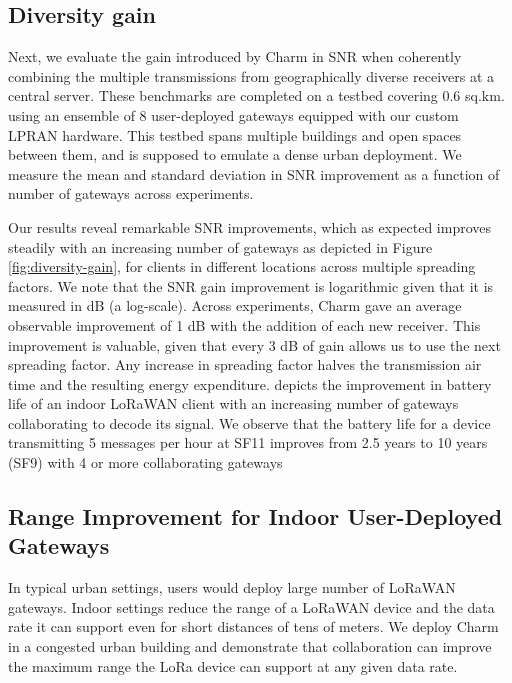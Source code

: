 \subsection{Diversity gain}
\label{sec:diversity-gain-eval}

Next, we evaluate the  gain introduced by Charm in SNR when coherently
combining the multiple transmissions from geographically diverse receivers at
a central server. These benchmarks are completed on a testbed covering 0.6
sq.km. using an ensemble of 8 user-deployed gateways equipped with our custom
LPRAN hardware. This testbed spans multiple buildings and open spaces between
them, and is supposed to emulate a dense urban deployment. We measure the mean
and standard deviation in SNR improvement as a function of number of gateways
across experiments.

Our results reveal remarkable SNR improvements, which as expected improves
steadily with an increasing number of gateways as depicted in Figure
\ref{fig:diversity-gain}, for clients in different locations across multiple
spreading factors. We note that the SNR gain improvement is logarithmic given
that it is measured in dB (a log-scale). Across experiments, Charm gave an
average observable improvement of 1 dB with the addition of each new receiver.
This improvement is valuable, given that every 3 dB of gain allows us to use
the next spreading factor. Any increase in spreading factor halves the
transmission air time and the resulting energy expenditure.
 depicts the improvement in battery life of an
indoor LoRaWAN client with an increasing number of gateways collaborating to
decode its signal. We observe that the battery life for a device transmitting
5 messages per hour at SF11 improves from 2.5 years to 10 years (SF9) with 4
or more collaborating gateways


\subsection{Range Improvement for Indoor User-Deployed Gateways}

In typical urban settings, users would deploy large number of LoRaWAN
gateways. Indoor settings reduce the range of a LoRaWAN device and the data
rate it can support even for short distances of tens of meters. We deploy
Charm in a congested urban building and demonstrate that collaboration can
improve the maximum range the LoRa device can support at any given data rate.

